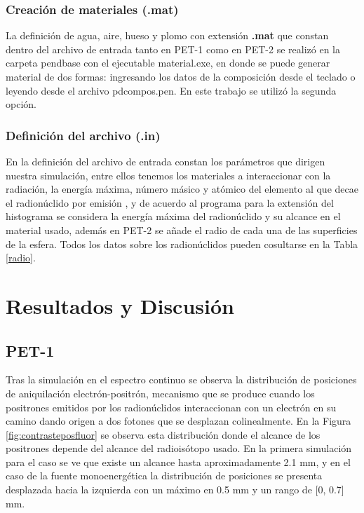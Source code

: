 \documentclass[12pt,a4paper,onecolumn]{article}
\begin{document}
\subsubsection*{Creación de materiales (.mat)}
La definición de agua, aire, hueso y plomo con extensión \textbf{.mat} que constan dentro del archivo de entrada tanto en PET-1 como en PET-2 se realizó en la carpeta pendbase con el ejecutable material.exe, en donde se puede generar material de dos formas: ingresando los datos de la composición desde el teclado o leyendo desde el archivo pdcompos.pen. En este trabajo se utilizó la segunda opción.

\subsubsection*{Definición del archivo (.in)}
En la definición del archivo de entrada constan los parámetros que dirigen nuestra simulación, entre ellos tenemos los materiales a interaccionar con la radiación, la energía máxima, número másico y atómico del elemento al que decae el radionúclido por emisión \ce{\beta^+}, y de acuerdo al programa para la extensión del histograma se considera la energía máxima del radionúclido y su alcance en el material usado, además en PET-2 se añade el radio de cada una de las superficies de la esfera. Todos los datos sobre los radionúclidos pueden cosultarse en la Tabla \ref{radio}.

\section{Resultados y Discusión}
\subsection*{PET-1}
Tras la simulación en el espectro continuo se observa la distribución de posiciones de aniquilación electrón-positrón, mecanismo que se produce cuando los positrones emitidos por los radionúclidos interaccionan con un electrón en su camino dando origen a dos fotones que se desplazan colinealmente. En la Figura \ref{fig:contrasteposfluor} se observa esta distribución donde el alcance de los positrones depende del alcance del radioisótopo usado. En la primera simulación para el caso   se ve que existe un alcance hasta aproximadamente 2.1 mm, y en el caso de la fuente monoenergética la distribución de posiciones se presenta desplazada hacia la izquierda con un máximo en 0.5 mm y un rango de [0, 0.7] mm.
\end{document}
